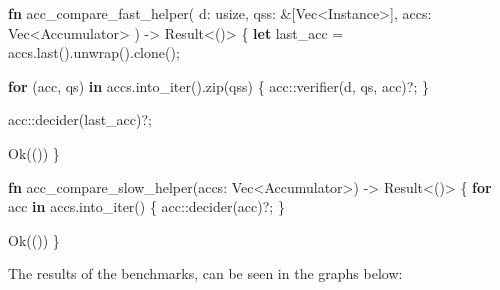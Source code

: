 \documentclass[
]{article}
\newenvironment{Shaded}{\begin{snugshade}}{\end{snugshade}}
\newcommand{\ConstantTok}[1]{\textcolor[rgb]{0.80,0.14,0.11}{#1}}
\newcommand{\ControlFlowTok}[1]{\textcolor[rgb]{0.80,0.14,0.11}{\textbf{#1}}}
\newcommand{\DataTypeTok}[1]{\textcolor[rgb]{0.71,0.46,0.08}{#1}}
\newcommand{\KeywordTok}[1]{\textcolor[rgb]{0.80,0.14,0.11}{\textbf{#1}}}
\newcommand{\NormalTok}[1]{\textcolor[rgb]{0.16,0.16,0.16}{#1}}
\newcommand{\OperatorTok}[1]{\textcolor[rgb]{0.56,0.25,0.44}{#1}}
\newcommand{\PreprocessorTok}[1]{\textcolor[rgb]{0.03,0.40,0.47}{#1}}
\begin{document}
\begin{Shaded}
\begin{Highlighting}[numbers=left,,]
  \KeywordTok{fn}\NormalTok{ acc\_compare\_fast\_helper(}
\NormalTok{    d}\OperatorTok{:} \DataTypeTok{usize}\OperatorTok{,}
\NormalTok{    qss}\OperatorTok{:} \OperatorTok{\&}\NormalTok{[}\DataTypeTok{Vec}\OperatorTok{\textless{}}\NormalTok{Instance}\OperatorTok{\textgreater{}}\NormalTok{]}\OperatorTok{,}
\NormalTok{    accs}\OperatorTok{:} \DataTypeTok{Vec}\OperatorTok{\textless{}}\NormalTok{Accumulator}\OperatorTok{\textgreater{}}
\NormalTok{  ) }\OperatorTok{{-}\textgreater{}} \DataTypeTok{Result}\OperatorTok{\textless{}}\NormalTok{()}\OperatorTok{\textgreater{}} \OperatorTok{\{}
      \KeywordTok{let}\NormalTok{ last\_acc }\OperatorTok{=}\NormalTok{ accs}\OperatorTok{.}\NormalTok{last()}\OperatorTok{.}\NormalTok{unwrap()}\OperatorTok{.}\NormalTok{clone()}\OperatorTok{;}

      \ControlFlowTok{for}\NormalTok{ (acc}\OperatorTok{,}\NormalTok{ qs) }\KeywordTok{in}\NormalTok{ accs}\OperatorTok{.}\NormalTok{into\_iter()}\OperatorTok{.}\NormalTok{zip(qss) }\OperatorTok{\{}
          \PreprocessorTok{acc::}\NormalTok{verifier(d}\OperatorTok{,}\NormalTok{ qs}\OperatorTok{,}\NormalTok{ acc)}\OperatorTok{?;}
      \OperatorTok{\}}

      \PreprocessorTok{acc::}\NormalTok{decider(last\_acc)}\OperatorTok{?;}

      \ConstantTok{Ok}\NormalTok{(())}
  \OperatorTok{\}}

  \KeywordTok{fn}\NormalTok{ acc\_compare\_slow\_helper(accs}\OperatorTok{:} \DataTypeTok{Vec}\OperatorTok{\textless{}}\NormalTok{Accumulator}\OperatorTok{\textgreater{}}\NormalTok{) }\OperatorTok{{-}\textgreater{}} \DataTypeTok{Result}\OperatorTok{\textless{}}\NormalTok{()}\OperatorTok{\textgreater{}} \OperatorTok{\{}
      \ControlFlowTok{for}\NormalTok{ acc }\KeywordTok{in}\NormalTok{ accs}\OperatorTok{.}\NormalTok{into\_iter() }\OperatorTok{\{}
          \PreprocessorTok{acc::}\NormalTok{decider(acc)}\OperatorTok{?;}
      \OperatorTok{\}}

      \ConstantTok{Ok}\NormalTok{(())}
  \OperatorTok{\}}
\end{Highlighting}
\end{Shaded}

The results of the benchmarks, can be seen in the graphs below:
\end{document}
